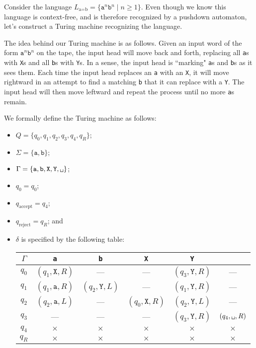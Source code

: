 \begin{example}\label{ex:TMaequalsb}
Consider the language $L_{\text{a}=\text{b}} = \{\texttt{a}^{n}\texttt{b}^{n} \mid n \geq 1\}$. Even though we know this language is context-free, and is therefore recognized by a pushdown automaton, let's construct a Turing machine recognizing the language.

The idea behind our Turing machine is as follows. Given an input word of the form $\texttt{a}^{n}\texttt{b}^{n}$ on the tape, the input head will move back and forth, replacing all \texttt{a}s with \texttt{X}s and all \texttt{b}s with \texttt{Y}s. In a sense, the input head is ``marking" \texttt{a}s and \texttt{b}s as it sees them. Each time the input head replaces an \texttt{a} with an \texttt{X}, it will move rightward in an attempt to find a matching \texttt{b} that it can replace with a \texttt{Y}. The input head will then move leftward and repeat the process until no more \texttt{a}s remain.

We formally define the Turing machine as follows:
\begin{itemize}
\item $Q = \{q_{0}, q_{1}, q_{2}, q_{3}, q_{4}, q_{R}\}$;
\item $\Sigma = \{\texttt{a}, \texttt{b}\}$;
\item $\Gamma = \{\texttt{a}, \texttt{b}, \texttt{X}, \texttt{Y}, \blankspace\}$;
\item $q_{0} = q_{0}$;
\item $q_{\text{accept}} = q_{4}$;
\item $q_{\text{reject}} = q_{R}$; and
\item $\delta$ is specified by the following table:
\begin{center}
\small
\begin{tabular}{c | c c c c c}
$\Gamma$	& \texttt{a}				& \texttt{b}				& \texttt{X}			& \texttt{Y}			& \blankspace \\
\hline
$q_{0}$		& $(q_{1}, \texttt{X}, R)$	& ---					& ---					& $(q_{3}, \texttt{Y}, R)$	& --- \\
$q_{1}$		& $(q_{1}, \texttt{a}, R)$	& $(q_{2}, \texttt{Y}, L)$	& ---					& $(q_{1}, \texttt{Y}, R)$	& --- \\
$q_{2}$		& $(q_{2}, \texttt{a}, L)$	& ---					& $(q_{0}, \texttt{X}, R)$	& $(q_{2}, \texttt{Y}, L)$	& --- \\
$q_{3}$		& ---					& ---					& ---					& $(q_{3}, \texttt{Y}, R)$	& $(q_{4}, \blankspace, R)$ \\
$q_{4}$		& $\times$			& $\times$			& $\times$			& $\times$			& $\times$ \\
$q_{R}$		& $\times$			& $\times$			& $\times$			& $\times$			& $\times$ \\
\end{tabular}
\end{center}
\end{itemize}


\end{example}
